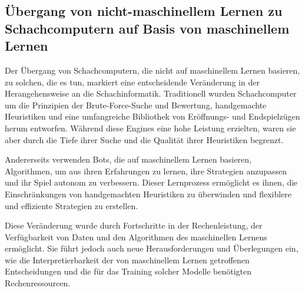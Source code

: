 \subsection{Übergang von nicht-maschinellem Lernen zu Schachcomputern auf Basis von maschinellem Lernen}
Der Übergang von Schachcomputern, die nicht auf maschinellem Lernen basieren, zu solchen, die es tun, 
markiert eine entscheidende Veränderung in der Herangehensweise an die Schachinformatik. 
Traditionell wurden Schachcomputer um die Prinzipien der Brute-Force-Suche und Bewertung, 
handgemachte Heuristiken und eine umfangreiche Bibliothek von Eröffnungs- und Endspielzügen herum entworfen. 
Während diese Engines eine hohe Leistung erzielten, waren sie aber durch die Tiefe ihrer Suche und die Qualität ihrer Heuristiken begrenzt.

Andererseits verwenden Bots, die auf maschinellem Lernen basieren, Algorithmen, um aus ihren Erfahrungen zu lernen, 
ihre Strategien anzupassen und ihr Spiel autonom zu verbessern. Dieser Lernprozess ermöglicht es ihnen, 
die Einschränkungen von handgemachten Heuristiken zu überwinden und flexiblere und effiziente Strategien zu erstellen.

Diese Veränderung wurde durch Fortschritte in der Rechenleistung, der Verfügbarkeit von Daten und den Algorithmen des maschinellen Lernens ermöglicht. 
Sie führt jedoch auch neue Herausforderungen und Überlegungen ein, wie die Interpretierbarkeit der von maschinellem Lernen getroffenen Entscheidungen 
und die für das Training solcher Modelle benötigten Rechenressourcen.~\cite{Demis_Hassabis_2017_nature}